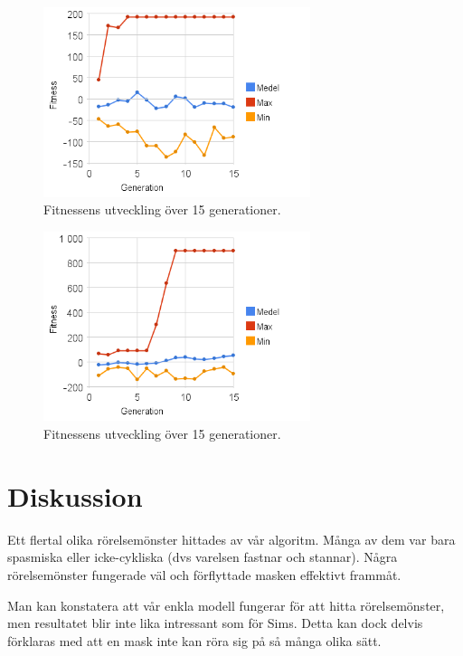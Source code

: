 \documentclass[titlepage, twocolumn, a4paper, 11pt, swedish]{article}
\begin{document}
\begin{figure}
    \includegraphics[width=78mm]{images/diagram3.png}
    \caption{Fitnessens utveckling över 15 generationer.}
    \label{fig:d2}
\end{figure}

\begin{figure}
    \includegraphics[width=78mm]{images/diagram_m01c08_2.png}
    \caption{Fitnessens utveckling över 15 generationer.}
    \label{fig:d3}
\end{figure}

\section{Diskussion}
Ett flertal olika rörelsemönster hittades av vår algoritm. Många av dem var bara spasmiska eller icke-cykliska (dvs varelsen fastnar och stannar). Några rörelsemönster fungerade väl och förflyttade masken effektivt frammåt. 

Man kan konstatera att vår enkla modell fungerar för att hitta rörelsemönster, men resultatet blir inte lika intressant som för Sims. Detta kan dock delvis förklaras med att en mask inte kan röra sig på så många olika sätt.
\end{document}
